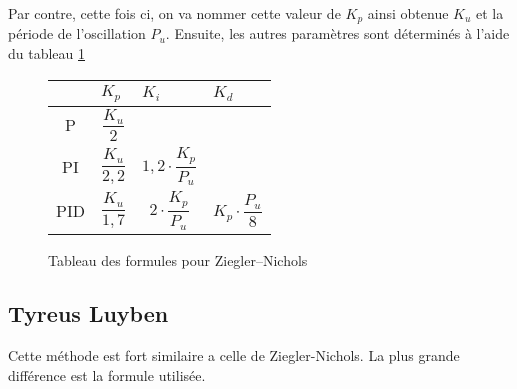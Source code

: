 Par contre, cette fois ci, on va nommer cette valeur de $K_p$ ainsi obtenue $K_u$ et la période de l'oscillation $P_u$.
Ensuite, les autres paramètres sont déterminés à l'aide du tableau \ref{tab:ZieglerNicholsTuningFormulas}

\def\tabularxcolumn#1{m{#1}}
\begin{figure}[ht]
	\begin{center}
		\begin{tabularx}{\textwidth}{| c | X | X | X |}
			\hline
			& $K_p$ & $K_i$ & $K_d$\\ \hline
			P & \begin{equation*}\frac{K_u}{2}\end{equation*} & &\\ \hline
			PI & \begin{equation*}\frac{K_u}{2,2}\end{equation*} & \begin{equation*}1,2 \cdot \frac{K_p}{P_u}\end{equation*} &\\ \hline
			PID & \begin{equation*}\frac{K_u}{1,7}\end{equation*} & \begin{equation*}2 \cdot \frac{K_p}{P_u}\end{equation*} & \begin{equation*}K_p \cdot \frac{P_u}{8}\end{equation*} \\
			\hline
		\end{tabularx}
	\end{center}
	\caption{Tableau des formules pour Ziegler–Nichols}
	\label{tab:ZieglerNicholsTuningFormulas}
\end{figure}

\subsection{Tyreus Luyben}
Cette méthode est fort similaire a celle de Ziegler-Nichols. La plus grande différence est la formule utilisée.

